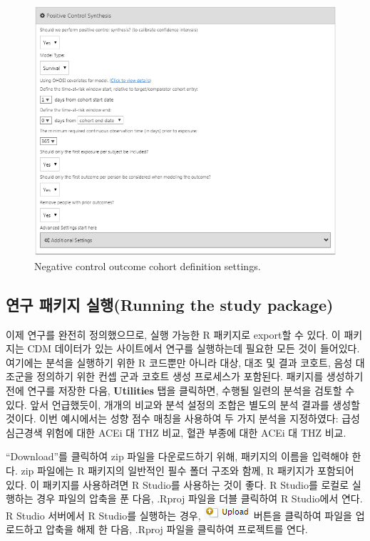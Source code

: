 \documentclass[11pt]{book}
\theoremstyle{definition}
\theoremstyle{definition}
\theoremstyle{definition}
\theoremstyle{remark}
\begin{document}
\begin{figure}

{\centering \includegraphics[width=1\linewidth]{images/PopulationLevelEstimation/pcSynthesis} 

}

\caption{Negative control outcome cohort definition settings.}\label{fig:pcSynthesis}
\end{figure}

\subsection{연구 패키지 실행(Running the study
package)}\label{--running-the-study-package}

이제 연구를 완전히 정의했으므로, 실행 가능한 R 패키지로 export할 수
있다. 이 패키지는 CDM 데이터가 있는 사이트에서 연구를 실행하는데 필요한
모든 것이 들어있다. 여기에는 분석을 실행하기 위한 R 코드뿐만 아니라
대상, 대조 및 결과 코호트, 음성 대조군을 정의하기 위한 컨셉 군과 코호트
생성 프로세스가 포함된다. 패키지를 생성하기 전에 연구를 저장한 다음,
\textbf{Utilities} 탭을 클릭하면, 수행될 일련의 분석을 검토할 수 있다.
앞서 언급했듯이, 개개의 비교와 분석 설정의 조합은 별도의 분석 결과를
생성할 것이다. 이번 예시에서는 성향 점수 매칭을 사용하여 두 가지 분석을
지정하였다: 급성심근경색 위험에 대한 ACEi 대 THZ 비교, 혈관 부종에 대한
ACEi 대 THZ 비교.

``Download''를 클릭하여 zip 파일을 다운로드하기 위해, 패키지의 이름을
입력해야 한다. zip 파일에는 R 패키지의 일반적인 필수 폴더 구조와 함께, R
패키지가 포함되어 있다. \citep{Wickham_2015} 이 패키지를 사용하려면 R
Studio를 사용하는 것이 좋다. R Studio를 로컬로 실행하는 경우 파일의
압축을 푼 다음, .Rproj 파일을 더블 클릭하여 R Studio에서 연다. R Studio
서버에서 R Studio를 실행하는 경우,
\includegraphics{images/PopulationLevelEstimation/upload.png} 버튼을
클릭하여 파일을 업로드하고 압축을 해제 한 다음, .Rproj 파일을 클릭하여
프로젝트를 연다.
\end{document}
